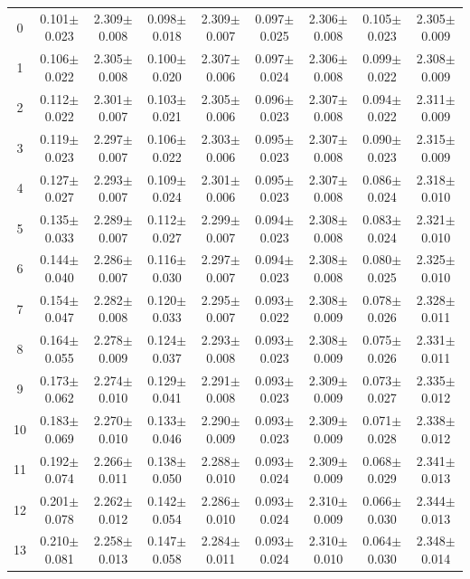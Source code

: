 \begin{table}[H]
{\begin{tabular}{c cc cc cc cc}
0 & 0.101$\pm$0.023 & 2.309$\pm$0.008 & 0.098$\pm$0.018 & 2.309$\pm$0.007 & 0.097$\pm$0.025 & 2.306$\pm$0.008 & 0.105$\pm$0.023 & 2.305$\pm$0.009 \\
1 & 0.106$\pm$0.022 & 2.305$\pm$0.008 & 0.100$\pm$0.020 & 2.307$\pm$0.006 & 0.097$\pm$0.024 & 2.306$\pm$0.008 & 0.099$\pm$0.022 & 2.308$\pm$0.009 \\
2 & 0.112$\pm$0.022 & 2.301$\pm$0.007 & 0.103$\pm$0.021 & 2.305$\pm$0.006 & 0.096$\pm$0.023 & 2.307$\pm$0.008 & 0.094$\pm$0.022 & 2.311$\pm$0.009 \\
3 & 0.119$\pm$0.023 & 2.297$\pm$0.007 & 0.106$\pm$0.022 & 2.303$\pm$0.006 & 0.095$\pm$0.023 & 2.307$\pm$0.008 & 0.090$\pm$0.023 & 2.315$\pm$0.009 \\
4 & 0.127$\pm$0.027 & 2.293$\pm$0.007 & 0.109$\pm$0.024 & 2.301$\pm$0.006 & 0.095$\pm$0.023 & 2.307$\pm$0.008 & 0.086$\pm$0.024 & 2.318$\pm$0.010 \\
5 & 0.135$\pm$0.033 & 2.289$\pm$0.007 & 0.112$\pm$0.027 & 2.299$\pm$0.007 & 0.094$\pm$0.023 & 2.308$\pm$0.008 & 0.083$\pm$0.024 & 2.321$\pm$0.010 \\
6 & 0.144$\pm$0.040 & 2.286$\pm$0.007 & 0.116$\pm$0.030 & 2.297$\pm$0.007 & 0.094$\pm$0.023 & 2.308$\pm$0.008 & 0.080$\pm$0.025 & 2.325$\pm$0.010 \\
7 & 0.154$\pm$0.047 & 2.282$\pm$0.008 & 0.120$\pm$0.033 & 2.295$\pm$0.007 & 0.093$\pm$0.022 & 2.308$\pm$0.009 & 0.078$\pm$0.026 & 2.328$\pm$0.011 \\
8 & 0.164$\pm$0.055 & 2.278$\pm$0.009 & 0.124$\pm$0.037 & 2.293$\pm$0.008 & 0.093$\pm$0.023 & 2.308$\pm$0.009 & 0.075$\pm$0.026 & 2.331$\pm$0.011 \\
9 & 0.173$\pm$0.062 & 2.274$\pm$0.010 & 0.129$\pm$0.041 & 2.291$\pm$0.008 & 0.093$\pm$0.023 & 2.309$\pm$0.009 & 0.073$\pm$0.027 & 2.335$\pm$0.012 \\
10 & 0.183$\pm$0.069 & 2.270$\pm$0.010 & 0.133$\pm$0.046 & 2.290$\pm$0.009 & 0.093$\pm$0.023 & 2.309$\pm$0.009 & 0.071$\pm$0.028 & 2.338$\pm$0.012 \\
11 & 0.192$\pm$0.074 & 2.266$\pm$0.011 & 0.138$\pm$0.050 & 2.288$\pm$0.010 & 0.093$\pm$0.024 & 2.309$\pm$0.009 & 0.068$\pm$0.029 & 2.341$\pm$0.013 \\
12 & 0.201$\pm$0.078 & 2.262$\pm$0.012 & 0.142$\pm$0.054 & 2.286$\pm$0.010 & 0.093$\pm$0.024 & 2.310$\pm$0.009 & 0.066$\pm$0.030 & 2.344$\pm$0.013 \\
13 & 0.210$\pm$0.081 & 2.258$\pm$0.013 & 0.147$\pm$0.058 & 2.284$\pm$0.011 & 0.093$\pm$0.024 & 2.310$\pm$0.010 & 0.064$\pm$0.030 & 2.348$\pm$0.014 \\

\end{tabular}}
\end{table}
